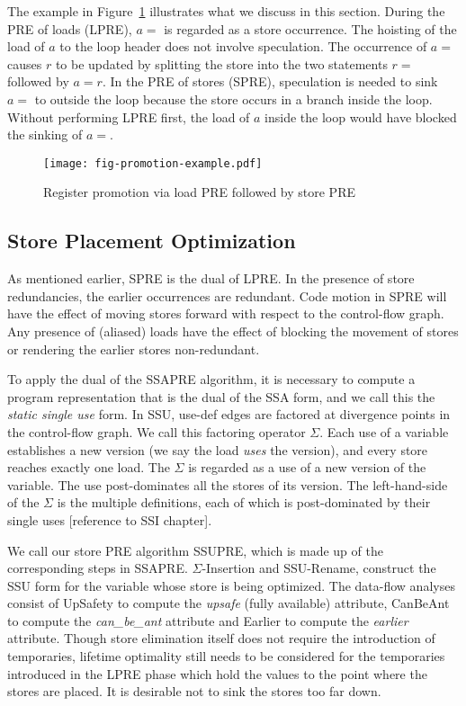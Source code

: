 The example in Figure~\ref{fig: promotion-example} illustrates what we discuss
in this section.  During the PRE of loads (LPRE), $a =$ is regarded as a
store occurrence.  The hoisting of the load of $a$ to the loop header does
not involve speculation. The occurrence of $a =$ causes $r$ to be updated
by splitting the store into the two statements $r =$ followed by $a = r$.  In 
the PRE of stores (SPRE), speculation is needed to sink $a =$ to outside the
loop because the store occurs in a branch inside the loop.  Without performing 
LPRE first, the load of $a$ inside the loop would
have blocked the sinking of $a =$.

\begin{figure}
\centering
\texttt{[image: fig-promotion-example.pdf]}
\caption{Register promotion via load PRE followed by store PRE}
\label{fig: promotion-example}
\end{figure}

\subsection{Store Placement Optimization}

As mentioned earlier, SPRE is the dual of LPRE.
In the presence of store redundancies, the earlier occurrences are redundant.
Code motion in SPRE will have the effect of moving stores forward with respect 
to the control-flow graph.  Any presence of (aliased) loads have the effect of
blocking the movement of stores or rendering the earlier stores non-redundant.

To apply the dual of the SSAPRE algorithm, it is necessary to compute a program
representation that is the dual of the SSA form, and we call this the 
\emph{static single use} form.  In SSU, use-def edges are factored at
divergence points in the control-flow graph.  We call this factoring operator
$\Sigma$.  Each use of a variable establishes a new version (we say the load 
\emph{uses} the version), and every store reaches exactly one load.   The
$\Sigma$ is regarded as a use of a new version of the variable.  The use
post-dominates all the stores of its version.  The left-hand-side of the
$\Sigma$ is the multiple definitions, each of which is post-dominated by their
single uses [reference to SSI chapter].

We call our store PRE algorithm SSUPRE, which is made up of the corresponding 
steps in SSAPRE.   $\Sigma$-Insertion and
SSU-Rename, construct the SSU form for the variable whose store is being 
optimized.  The data-flow analyses consist of UpSafety to compute the
\emph{upsafe} (fully available) attribute, CanBeAnt to compute the
\emph{can\_be\_ant} attribute and Earlier to compute the \emph{earlier}
attribute.  Though store elimination itself does not require
the introduction of temporaries, lifetime optimality still needs to be
considered for the temporaries introduced in the LPRE phase which hold the 
values to the point where the stores are placed.  It is desirable not 
to sink the stores too far down.  

